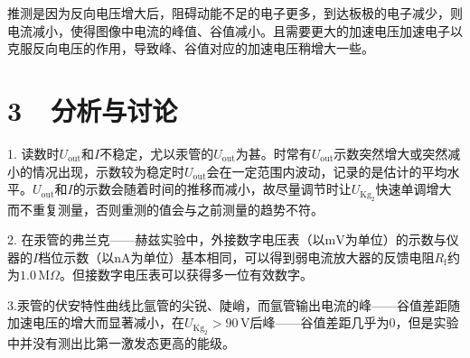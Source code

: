 \documentclass[a4paper,fontset=windows]{ctexart}
\begin{document}
    推测是因为反向电压增大后，阻碍动能不足的电子更多，到达板极的电子减少，则电流减小，使得图像中电流的峰值、谷值减小。且需要更大的加速电压加速电子以克服反向电压的作用，导致峰、谷值对应的加速电压稍增大一些。

    \section*{3\ \  分析与讨论}

    1. 读数时$U_\mathrm{out}$和$I$不稳定，尤以汞管的$U_\mathrm{out}$为甚。时常有$U_\mathrm{out}$示数突然增大或突然减小的情况出现，示数较为稳定时$U_\mathrm{out}$会在一定范围内波动，记录的是估计的平均水平。$U_\mathrm{out}$和$I$的示数会随着时间的推移而减小，故尽量调节时让$U_{\mathrm{Kg_2}}$快速单调增大而不重复测量，否则重测的值会与之前测量的趋势不符。

    2. 在汞管的弗兰克——赫兹实验中，外接数字电压表（以$\mathrm{mV}$为单位）的示数与仪器的$I$档位示数（以$\mathrm{nA}$为单位）基本相同，可以得到弱电流放大器的反馈电阻$R_{\mathrm{f}}$约为$1.0\,\mathrm{M}\Omega$。但接数字电压表可以获得多一位有效数字。

    3.汞管的伏安特性曲线比氩管的尖锐、陡峭，而氩管输出电流的峰——谷值差距随加速电压的增大而显著减小，在$U_{\mathrm{Kg_2}} > 90\,\mathrm{V}$后峰——谷值差距几乎为0，但是实验中并没有测出比第一激发态更高的能级。
\end{document}
